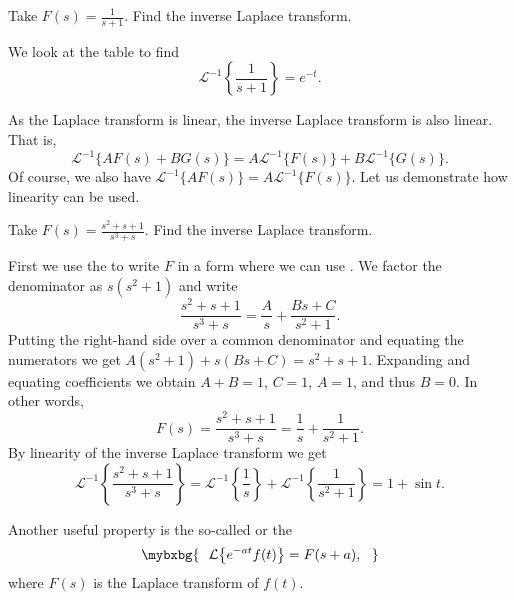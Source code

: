 \begin{example}
Take
$F(s) = \frac{1}{s+1}$.  Find the inverse Laplace transform.

We look at the table to find
\begin{equation*}
{\mathcal{L}}^{-1} \left\{ \frac{1}{s+1} \right\} = 
e^{-t} .
\end{equation*}
\end{example}

As the Laplace transform is linear, the inverse Laplace
transform is also linear.  That is,
\begin{equation*}
{\mathcal{L}}^{-1} \bigl\{ A F(s) + B G(s) \bigr\} =
A {\mathcal{L}}^{-1} \bigl\{ F(s) \bigr\} +
B {\mathcal{L}}^{-1} \bigl\{ G(s) \bigr\} .
\end{equation*}
Of course, we also have
${\mathcal{L}}^{-1} \bigl\{ A F(s) \bigr\} =
A {\mathcal{L}}^{-1} \bigl\{ F(s) \bigr\}$.
Let us demonstrate how linearity can be used.

\begin{example}
Take
$F(s) = \frac{s^2+s+1}{s^3+s}$.  Find the inverse Laplace transform.

First we use the \emph{} to write $F$ in a form where
we can use .  We factor the denominator as
$s(s^2+1)$ and write
\begin{equation*}
\frac{s^2+s+1}{s^3+s}
=
\frac{A}{s} + 
\frac{Bs+C}{s^2+1} .
\end{equation*}
Putting the right-hand side over a common
denominator and equating the numerators we get
$A(s^2+1) + s(Bs+C) = s^2+s+1$.  Expanding and equating coefficients
we obtain $A+B = 1$, $C=1$, $A=1$,
and thus $B=0$.  In
other words,
\begin{equation*}
F(s) =
\frac{s^2+s+1}{s^3+s}
=
\frac{1}{s} +
\frac{1}{s^2+1} .
\end{equation*}
By linearity of the inverse Laplace transform we get 
\begin{equation*}
{\mathcal{L}}^{-1} \left\{ 
\frac{s^2+s+1}{s^3+s} \right\}
=
{\mathcal{L}}^{-1} \left\{ 
\frac{1}{s} \right\} 
+
{\mathcal{L}}^{-1} \left\{ 
\frac{1}{s^2+1} \right\}
=
1 + 
\sin t .
\end{equation*}
\end{example}

Another useful property is the 
so-called \emph{} or
the \emph{}
\begin{equation*}
\mybxbg{~~
\mathcal{L} \bigl\{ e^{-at} f(t) \bigr\} = F(s+a) ,
~~}
\end{equation*}
where $F(s)$ is the Laplace transform of $f(t)$.

